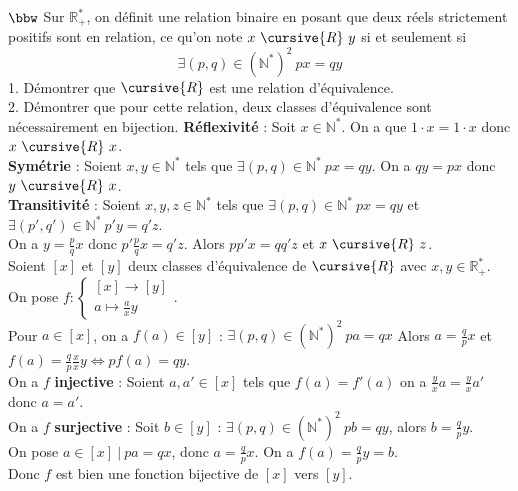 \documentclass[11pt]{article}
\renewcommand*{\r}{\cursive{R}}
\begin{document}
\begin{exercice}{$\bbw$}{}
    Sur $\mathbb{R}^*_+$, on définit une relation binaire en posant que deux réels strictement positifs sont en relation, ce qu'on note $x~\r~y$ si et seulement si
    \begin{equation*}
        \exists(p,q)\in(\mathbb{N}^*)^2 ~ px = qy
    \end{equation*}
    1. Démontrer que $\r$ est une relation d'équivalence.\\
    2. Démontrer que pour cette relation, deux classes d'équivalence sont nécessairement en bijection.
    \tcblower
    \textbf{Réflexivité} : Soit $x\in\mathbb{N}^*$. On a que $1\cdot x = 1\cdot x$ donc $x ~ \r ~ x$.\\
    \textbf{Symétrie} : Soient $x,y\in\mathbb{N}^*$ tels que $\exists(p,q)\in\mathbb{N}^* ~ px = qy$. On a $qy = px$ donc $y ~ \r ~ x$.\\
    \textbf{Transitivité} : Soient $x,y,z\in\mathbb{N}^*$ tels que $\exists(p,q)\in\mathbb{N}^*~px=qy$ et $\exists(p',q')\in\mathbb{N}^*~p'y=q'z$.\\
    On a $y=\frac{p}{q}x$ donc $p'\frac{p}{q}x=q'z$. Alors $pp'x=qq'z$ et $x~\r~z$.\\[0.15cm]
     Soient $[x]$ et $[y]$ deux classes d'équivalence de $\r$ avec $x,y\in\mathbb{R}^*_+$.\\
    On pose $f:\begin{cases}
        [x] \to [y]\\
        a\mapsto \frac{a}{x}y
    \end{cases}$.\\
    Pour $a\in[x]$, on a $f(a)\in[y]$ : $\exists (p,q)\in(\mathbb{N}^*)^2 ~ pa = qx$ Alors $a=\frac{q}{p}x$ et $f(a)=\frac{q}{p}\frac{x}{x}y \iff pf(a)=qy$.\\
    On a $f$ \textbf{injective} : Soient $a,a'\in[x]$ tels que $f(a)=f'(a)$ on a $\frac{y}{x}a=\frac{y}{x}a'$ donc $a=a'$.\\
    On a $f$ \textbf{surjective} : Soit $b\in[y]$ : $\exists(p,q)\in(\mathbb{N}^*)^2 ~ pb = qy$, alors $b=\frac{q}{p}y$.\\
    On pose $a\in[x] ~ | ~ pa=qx$, donc $a=\frac{q}{p}x$. On a $f(a)=\frac{q}{p}y=b$.\\
    Donc $f$ est bien une fonction bijective de $[x]$ vers $[y]$.
\end{exercice}
\end{document}
